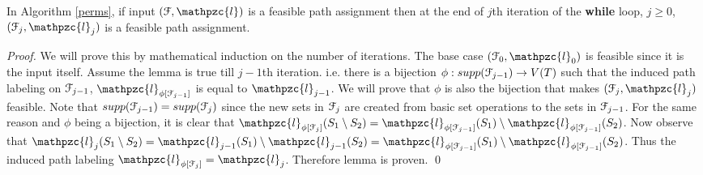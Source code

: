 \documentclass[a4paper,UKenglish,numberwithinsect]{lipics}
\def\cF{{\cal F}}
\def\cl{\mathpzc{l}}
\begin{document}
\begin{lemma} 
  \label{lem:feasible} In Algorithm \ref{perms}, if input $(\cF, \cl)$ is a
  feasible path assignment then at the end of $j$th iteration of the
  {\bf while} loop, $j \ge 0$, 
  $(\cF_j, \cl_j)$ is a feasible path assignment.
\end{lemma}
\begin{proof}
  We will prove this by mathematical induction on the number of
  iterations. The base case $(\cF_0, \cl_0)$ is feasible since it is
  the input itself. Assume the lemma is true till $j-1$th
  iteration. i.e. there is a bijection $\phi: supp(\cF_{j-1})
  \rightarrow V(T)$ such that the induced path labeling on $\cF_{j-1}$,
   $\cl_{\phi[{\cF_{j-1}}]}$ is equal to $\cl_{j-1}$. We will prove that $\phi$ is
  also the bijection that makes $(\cF_j, \cl_j)$ feasible. Note that
  $supp(\cF_{j-1}) = supp(\cF_{j})$ since the new sets in $\cF_j$ are
  created from basic set operations to the sets in $\cF_{j-1}$. For
  the same reason and
  $\phi$ being a bijection, it is clear that $ \cl_{\phi[{\cF_{j}}]}(S_1
  \setminus S_2) = \cl_{\phi[{\cF_{j-1}}]}(S_1) \setminus
  \cl_{\phi[{\cF_{j-1}}]}(S_2)$. Now observe that $ \cl_j(S_1
  \setminus S_2) = \cl_{j-1}(S_1) \setminus \cl_{j-1}(S_2) =
  \cl_{\phi[{\cF_{j-1}}]}(S_1) \setminus
  \cl_{\phi[{\cF_{j-1}}]}(S_2)$. Thus the induced path labeling $\cl_{\phi[{\cF_{j}}]} =
  \cl_{j}$. Therefore lemma is proven. 
\qed
\end{proof}
\end{document}
